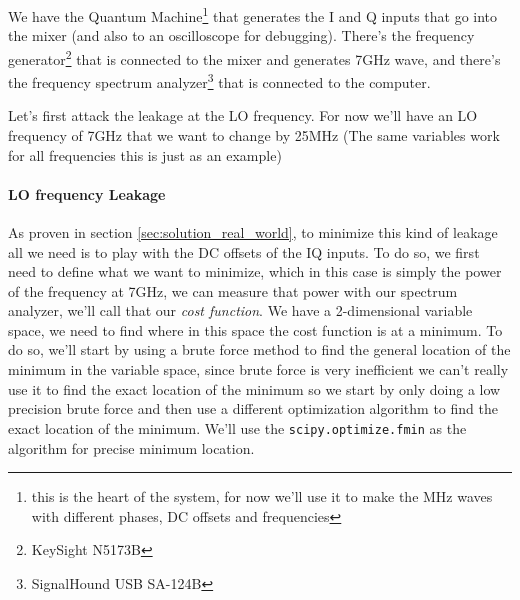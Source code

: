 We have the Quantum Machine\footnote{this is the heart of the system, for now we'll use it to make the MHz waves with different phases, DC offsets and frequencies} that generates the I and Q inputs that go into the mixer (and also to an oscilloscope for debugging). There's the frequency generator\footnote{KeySight N5173B} that is connected to the mixer and generates 7GHz wave, and there's the frequency spectrum analyzer\footnote{SignalHound USB SA-124B} that is connected to the computer.

Let's first attack the leakage at the LO frequency. For now we'll have an LO frequency of 7GHz that we want to change by 25MHz (The same variables work for all frequencies this is just as an example)

\paragraph{LO frequency Leakage}
As proven in section \ref{sec:solution_real_world}, to minimize this kind of leakage all we need is to play with the DC offsets of the IQ inputs. To do so, we first need to define what we want to minimize, which in this case is simply the power of the frequency at 7GHz, we can measure that power with our spectrum analyzer, we'll call that our \textit{cost function}.
We have a 2-dimensional variable space, we need to find where in this space the cost function is at a minimum. To do so, we'll start by using a brute force method to find the general location of the minimum in the variable space, since brute force is very inefficient we can't really use it to find the exact location of the minimum so we start by only doing a low precision brute force and then use a different optimization algorithm to find the exact location of the minimum. We'll use the \texttt{scipy.optimize.fmin} as the algorithm for precise minimum location.

